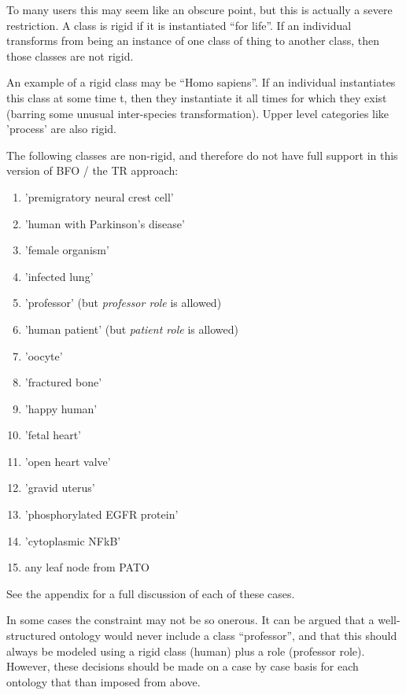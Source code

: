 \documentclass{bioinfo}
\begin{document}
To many users this may seem like an obscure point, but this is
actually a severe restriction. A class is rigid if it is instantiated
``for life''. If an individual transforms from being an instance of
one class of thing to another class, then those classes are not rigid.

An example of a rigid class may be ``Homo sapiens''. If an individual
instantiates this class at some time t, then they instantiate it all
times for which they exist (barring some unusual inter-species
transformation). Upper level categories like 'process' are also rigid.

The following classes are non-rigid, and therefore do not have full
support in this version of BFO / the TR approach:

\begin{enumerate}

  \item 'premigratory neural crest cell'
  \item 'human with Parkinson's disease'
  \item 'female organism'
  \item 'infected lung'
  \item 'professor' (but \emph{professor role} is allowed)
  \item 'human patient' (but \emph{patient role} is allowed)
  \item 'oocyte'
  \item 'fractured bone'
  \item 'happy human'
  \item 'fetal heart'
  \item 'open heart valve'
  \item 'gravid uterus'
  \item 'phosphorylated EGFR protein'
  \item 'cytoplasmic NFkB'
  \item any leaf node from PATO

\end{enumerate}

See the appendix for a full discussion of each of these cases.

In some cases the constraint may not be so onerous. It can be argued
that a well-structured ontology would never include a class
``professor'', and that this should always be modeled using a rigid
class (human) plus a role (professor role). However, these decisions
should be made on a case by case basis for each ontology that than
imposed from above.
\end{document}
